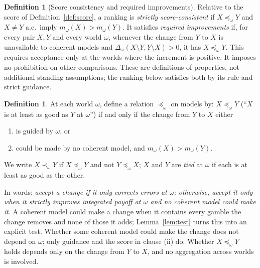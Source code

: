 \documentclass[11pt]{article}
\theoremstyle{plain}
\theoremstyle{definition}
\newtheorem{definition}[theorem]{Definition}
\theoremstyle{remark}
\begin{document}
\begin{definition}[Score consistency and required improvements]\label{def:required-improvements}
Relative to the score of Definition~\ref{def:score}, a ranking is \emph{strictly
score-consistent} if $X\preceq_\omega Y$ and $X\ne Y$ a.e.\ imply
$m_\omega(X)>m_\omega(Y)$.
It satisfies \emph{required improvements} if, for every pair $X,Y$ and every world
$\omega$, whenever the change from $Y$ to $X$ is unavailable to coherent models and
$\Delta_\omega(X\setminus Y,Y\setminus X)>0$, it has $X\preceq_\omega Y$.
This requires acceptance only at the worlds where the increment is positive. It imposes
no prohibition on other comparisons. These are definitions of properties, not additional
standing assumptions; the ranking below satisfies both by its rule and strict guidance.
\end{definition}

\begin{definition}\label{def:ranking}
At each world $\omega$, define a relation $\preceq_\omega$ on models by: $X\preceq_\omega Y$
(``$X$ is at least as good as $Y$ at $\omega$'') if and only if the change from $Y$ to $X$
either
\begin{enumerate}[label=(\roman*)]
  \item is guided by $\omega$, or
  \item could be made by no coherent model, and $m_\omega(X)>m_\omega(Y)$.
\end{enumerate}
We write $X\prec_\omega Y$ if $X\preceq_\omega Y$ and not $Y\preceq_\omega X$; $X$ and $Y$ are
\emph{tied} at $\omega$ if each is at least as good as the other.
\end{definition}

In words: \emph{accept a change if it only corrects errors at $\omega$; otherwise, accept it
only when it strictly improves integrated payoff at $\omega$ and no coherent model could make
it}. A coherent model could make a change when it contains every gamble the change removes and
none of those it adds; Lemma~\ref{lem:test} turns this into an explicit test. Whether some coherent model could make
the change does not depend on $\omega$; only guidance and the score in clause (ii) do. Whether
$X\preceq_\omega Y$ holds depends only on the change from $Y$ to $X$, and no aggregation across
worlds is involved.
\end{document}
